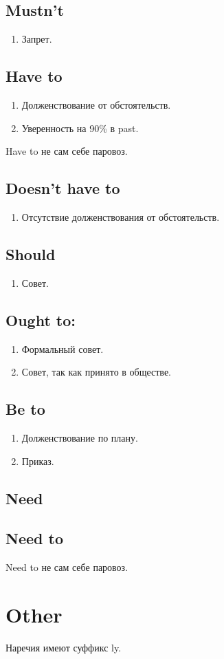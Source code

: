 \documentclass[oneside]{book}
\begin{document}
    \section{Mustn't}
    \begin{enumerate}
        \item Запрет.
    \end{enumerate}

    \section{Have to}
    \begin{enumerate}
        \item Долженствование от обстоятельств.
        \item Уверенность на 90\% в past.
    \end{enumerate}

    Have to не сам себе паровоз.

    \section{Doesn't have to}
    \begin{enumerate}
        \item Отсутствие долженствования от обстоятельств.
    \end{enumerate}

    \section{Should}
    \begin{enumerate}
        \item Совет.
    \end{enumerate}

    \section{Ought to:}
    \begin{enumerate}
        \item Формальный совет.
        \item Совет, так как принято в обществе.
    \end{enumerate}

    \section{Be to}
    \begin{enumerate}
        \item Долженствование по плану.
        \item Приказ.
    \end{enumerate}

    \section{Need}

    \section{Need to}
    Need to не сам себе паровоз.

    \chapter{Other}
    Наречия имеют суффикс ly.
\end{document}
